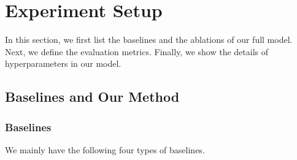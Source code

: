 \section{Experiment Setup}
\label{sec:eval}

In this section, we first list the baselines and the ablations of our full model. Next, we define the evaluation metrics. Finally, we show the details of hyperparameters in our model.

\subsection{Baselines and Our Method}

\subsubsection{Baselines} 
We mainly have the following four types of baselines.
